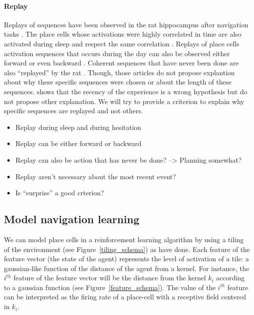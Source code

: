 \documentclass[]{article}
\begin{document}
\paragraph{Replay}
Replays of sequences have been observed in the rat hippocampus after navigation tasks \parencite{wilson_reactivation_1994, skaggs_replay_1996, davidson_hippocampal_2009, gupta_hippocampal_2010}. The place cells whose activations were highly correlated in time are also activated during sleep and respect the same correlation \parencite{wilson_reactivation_1994}. Replays of place cells activation sequences that occurs during the day can also be observed either forward \parencite{skaggs_replay_1996} or even backward \parencite{gupta_hippocampal_2010}. Coherent sequences that have never been done are also ``replayed'' by the rat \parencite{gupta_hippocampal_2010}. Though, those articles do not propose explantion about why these specific sequences were chosen or about the length of these sequences. \textcite{gupta_hippocampal_2010} shows that the recency of the experience is a wrong hypothesis but do not propose other explanation. We will try to provide a criterion to explain why specific sequences are replayed and not others.



\begin{itemize}
\item Replay during sleep and during hesitation
\item Replay can be either forward or backward
\item Replay can also be action that has never be done? --> Planning somewhat?
\item Replay aren't necessary about the most recent event?
\item Is ``surprise'' a good crterion?
\end{itemize}

\subsection{Model navigation learning}\label{model-navigation-learning}

We can model place cells in a reinforcement learning algorithm by using a tiling of the environment (see Figure~\ref{tiling_schema}) as \textcite{	tamosiunaite_path-finding_2008} have done. Each feature of the feature vector (the state of the agent) represents the level of activation of a tile: a gaussian-like function of the distance of the agent from a kernel. For instance, the \(i^{th}\) feature of the feature vector will be the distance from the kernel \(k_i\) according to a gaussian function (see Figure~\ref{feature_schema}). The value of the \(i^{th}\) feature can be interpreted as the firing rate of a place-cell with a receptive field centered in \(k_i\).
\end{document}
